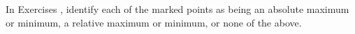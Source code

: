 {\noindent In Exercises}
{, identify each of the marked points as being an absolute maximum or minimum, a relative maximum or minimum, or none of the above.}
